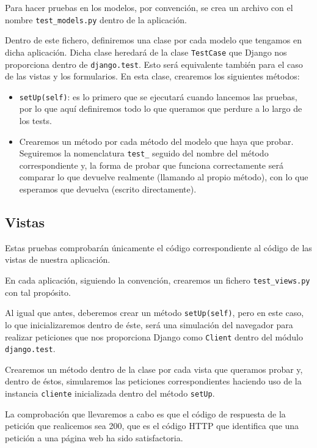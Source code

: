 Para hacer pruebas en los modelos, por convención, se crea un archivo con el nombre \texttt{test\_models.py} dentro de la aplicación.

Dentro de este fichero, definiremos una clase por cada modelo que tengamos en dicha aplicación. Dicha clase heredará de la clase \texttt{TestCase} que Django nos proporciona dentro de \texttt{django.test}. Esto será equivalente también para el caso de las vistas y los formularios. En esta clase, crearemos los siguientes métodos:

\begin{itemize}
	\item \texttt{setUp(self)}: es lo primero que se ejecutará cuando lancemos las pruebas, por lo que aquí definiremos todo lo que queramos que perdure a lo largo de los tests.
	\item Crearemos un método por cada método del modelo que haya que probar. Seguiremos la nomenclatura \texttt{test\_} seguido del nombre del método correspondiente y, la forma de probar que funciona correctamente será comparar lo que devuelve realmente (llamando al propio método), con lo que esperamos que devuelva (escrito directamente).
\end{itemize}

\subsection{Vistas}

Estas pruebas comprobarán únicamente el código correspondiente al código de las vistas de nuestra aplicación.

En cada aplicación, siguiendo la convención, crearemos un fichero \texttt{test\_views.py} con tal propósito.

Al igual que antes, deberemos crear un método \texttt{setUp(self)}, pero en este caso, lo que inicializaremos dentro de éste, será una simulación del navegador para realizar peticiones que nos proporciona Django como \texttt{Client} dentro del módulo \texttt{django.test}.

Crearemos un método dentro de la clase por cada vista que queramos probar y, dentro de éstos, simularemos las peticiones correspondientes haciendo uso de la instancia \texttt{cliente} inicializada dentro del método \texttt{setUp}.

La comprobación que llevaremos a cabo es que el código de respuesta de la petición que realicemos sea 200, que es el código HTTP que identifica que una petición a una página web ha sido satisfactoria.

